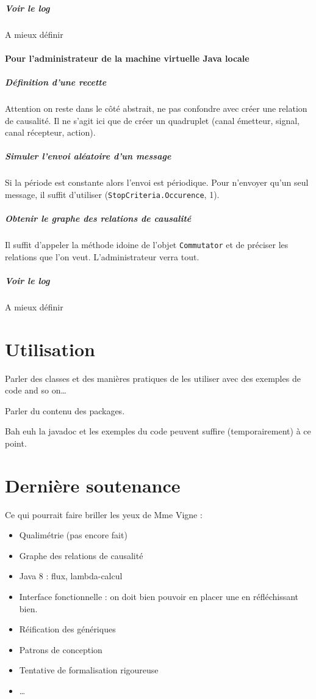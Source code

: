 \documentclass[11pt]{article}
\begin{document}
\subparagraph{Voir le log} A mieux définir

\paragraph{Pour l'administrateur de la machine virtuelle Java locale}

\subparagraph{Définition d'une recette} Attention on reste dans le côté abstrait, ne pas confondre avec créer une relation de causalité. Il ne s'agit ici que de créer un quadruplet (canal émetteur, signal, canal récepteur, action).

\subparagraph{Simuler l'envoi aléatoire d'un message} Si la période est constante alors l'envoi est périodique. Pour n'envoyer qu'un seul message, il suffit d'utiliser (\texttt{StopCriteria.Occurence}, 1).

\subparagraph{Obtenir le graphe des relations de causalité} Il suffit d'appeler la méthode idoine de l'objet \texttt{Commutator} et de préciser les relations que l'on veut. L'administrateur verra tout.

\subparagraph{Voir le log} A mieux définir

\section{Utilisation}

Parler des classes et des manières \og pratiques \fg{} de les utiliser avec des exemples de code and so on\dots

Parler du contenu des packages.

Bah euh la javadoc et les exemples du code peuvent suffire (temporairement) à ce point.

\section{Dernière soutenance}

Ce qui pourrait faire briller les yeux de Mme Vigne :
\begin{itemize}
\item Qualimétrie (pas encore fait)
\item Graphe des relations de causalité
\item Java 8 : flux, lambda-calcul
\item Interface fonctionnelle : on doit bien pouvoir en placer une en réfléchissant bien.
\item Réification des génériques
\item Patrons de conception
\item Tentative de formalisation rigoureuse
\item \dots
\end{itemize}
\end{document}
